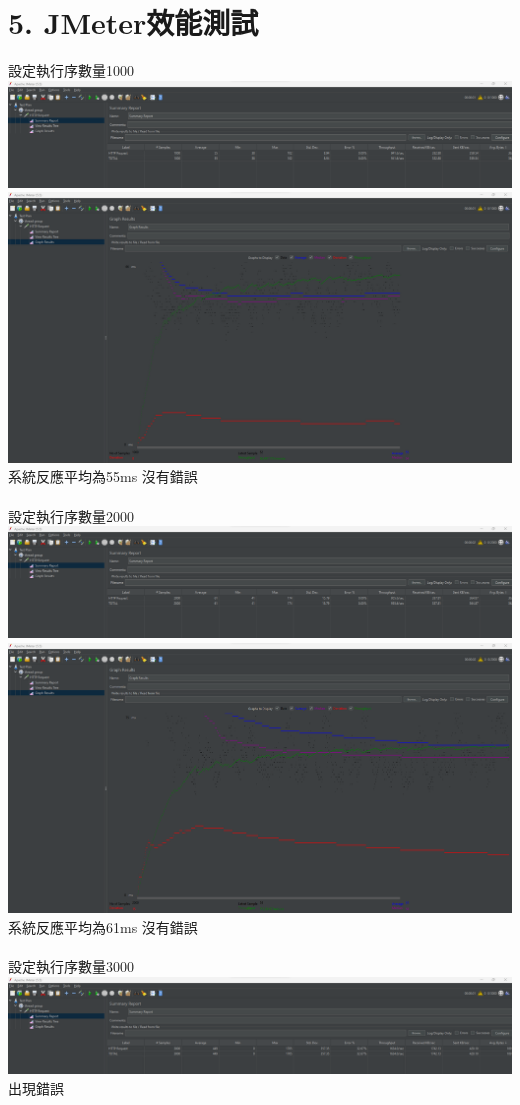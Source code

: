 \documentclass{report}
\begin{document}
\section*{5. JMeter效能測試}
\graphicspath{ {./images} }
設定執行序數量1000 \\
\includegraphics[scale=0.35]{1000_1.png}
\includegraphics[scale=0.35]{1000_2.png}
系統反應平均為55ms 沒有錯誤
\\
\newline
\\
設定執行序數量2000 \\
\includegraphics[scale=0.35]{2000_1.png}
\includegraphics[scale=0.35]{2000_2.png}
系統反應平均為61ms 沒有錯誤
\\
\newline
\\
設定執行序數量3000 \\
\includegraphics[scale=0.35]{3000.png}
出現錯誤
\\
\newline
\\
\end{document}
